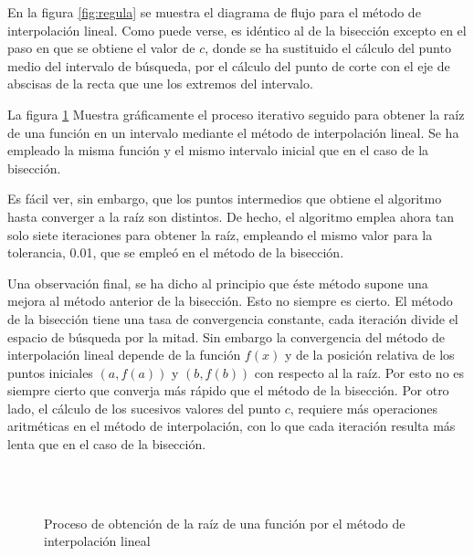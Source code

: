 En la figura \ref{fig:regula} se muestra el diagrama de flujo para el método de interpolación lineal. Como puede verse, es idéntico al de la bisección excepto en el paso en que se obtiene el valor de $c$, donde se ha sustituido el cálculo del punto medio del intervalo de búsqueda, por el cálculo del punto de corte con el eje de abscisas  de la recta que une los extremos del intervalo.

La figura \ref{fig:iterr2} Muestra gráficamente el proceso iterativo seguido para obtener la raíz de una función en un intervalo mediante el método de interpolación lineal. Se ha empleado la misma función y el mismo intervalo inicial que en el caso de la bisección. 

Es fácil ver, sin embargo, que los puntos intermedios que obtiene el algoritmo hasta converger a la raíz son distintos. De hecho, el algoritmo emplea ahora tan solo siete iteraciones para obtener la raíz, empleando el mismo valor para la tolerancia, 0.01, que se empleó en el método de la bisección.

Una observación final, se ha dicho al principio que éste método supone una mejora al método anterior de la bisección. Esto no siempre es cierto. El método de la bisección tiene una tasa de convergencia constante, cada iteración divide el espacio de búsqueda por la mitad. Sin embargo la convergencia del método de interpolación  lineal depende de la función $f(x)$ y de la posición relativa de los puntos iniciales $(a, f(a))$  y $(b, f(b))$ con respecto al la raíz. Por esto no es siempre cierto que converja más rápido que el método de  la bisección. Por otro lado, el cálculo de los sucesivos valores del punto $c$, requiere más operaciones aritméticas en el método de interpolación, con lo que cada iteración resulta más lenta que en el caso de la bisección.
\begin{figure}
\centering
{} \qquad
{}\\
\qquad
{}\\

\caption{Proceso de obtención de la raíz de una función por el método de interpolación lineal}
\label{fig:iterr2}
\end{figure}

